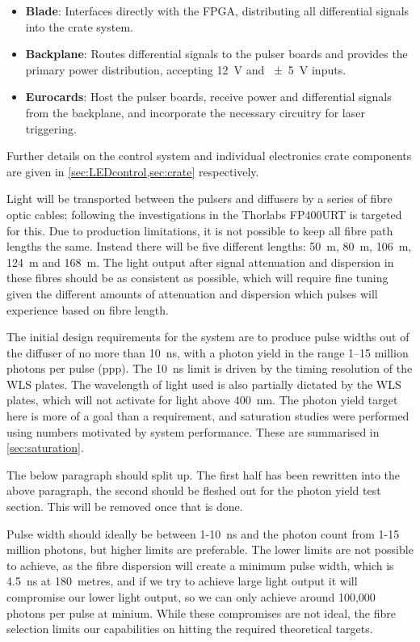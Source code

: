 \documentclass[a4paper,11pt]{article}
\begin{document}
\begin{itemize}
\item \textbf{Blade}: Interfaces directly with the FPGA, distributing all differential signals into the crate system.
\item \textbf{Backplane}: Routes differential signals to the pulser boards and provides the primary power distribution, accepting \SI{12}{\volt} and \SI{\pm5}{\volt} inputs.
\item \textbf{Eurocards}: Host the pulser boards, receive power and differential signals from the backplane, and incorporate the necessary circuitry for laser triggering.
\end{itemize}
Further details on the control system and individual electronics crate components are given in \cref{sec:LEDcontrol,sec:crate} respectively.

Light will be transported between the pulsers and diffusers by a series of fibre optic cables; following the investigations in \cite{TN91} the Thorlabs FP400URT \cite{FP400URT} is targeted for this. Due to production limitations, it is not possible to keep all fibre path lengths the same. Instead there will be five different lengths: 50~m, 80~m, 106~m, 124~m and 168~m. The light output after signal attenuation and dispersion in these fibres should be as consistent as possible, which will require fine tuning given the different amounts of attenuation and dispersion which pulses will experience based on fibre length.

The initial design requirements for the system are to produce pulse widths out of the diffuser of no more than 10~ns, with a photon yield in the range 1--15 million photons per pulse (ppp). The 10~ns limit is driven by the timing resolution of the WLS plates. The wavelength of light used is also partially dictated by the WLS plates, which will not activate for light above 400~nm. The photon yield target here is more of a goal than a requirement, and saturation studies were performed using numbers motivated by system performance. These are summarised in \cref{sec:saturation}.

{\color{red} The below paragraph should split up. The first half has been rewritten into the above paragraph, the second should be fleshed out for the photon yield test section. This will be removed once that is done.

Pulse width should ideally be between 1-10~ns and the photon count from 1-15 million photons, but higher limits are preferable. The lower limits are not possible to achieve, as the fibre dispersion will create a minimum pulse width, which is 4.5~ns at 180~metres, and if we try to achieve large light output it will compromise our lower light output, so we can only achieve around 100,000 photons per pulse at minium. While these compromises are not ideal, the fibre selection limits our capabilities on hitting the required theoretical targets.
}
\end{document}

